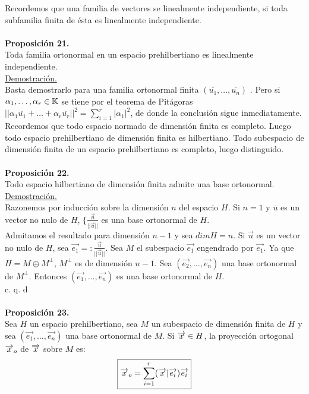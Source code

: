 Recordemos que una familia de vectores se linealmente independiente, si toda subfamilia finita de ésta es linealmente independiente. \\
 \\
 \textbf{Proposición 21.} \\
 Toda familia ortonormal en un espacio prehilbertiano es linealmente independiente.
 \\
 \underline{Demostración.}  \\
 Basta demostrarlo para una familia ortonormal finita $(\overline{u_1}, \ldots, \overline{u_n})$ . Pero si $\alpha_1 , \ldots, \alpha_r \in \mathbb{K}$ se tiene por el teorema de Pitágoras $|| \alpha_1 \overline{u_1}+ \ldots + \alpha_r \overline{u_r}||^2=\sum_{i=1}^r | \alpha_1|^2$, de donde la conclusión sigue inmediatamente. \\
 Recordemos que todo espacio normado de dimensión finita es completo. Luego todo espacio prehilbertiano de dimensión finita es hilbertiano. Todo subespacio de dimensión finita de un espacio prehilbertiano es completo, luego distinguido. \\ \\
 \textbf{Proposición 22.}\\
 Todo espacio hilbertiano de dimensión finita admite una base ortonormal.
 \\
 \underline{Demostración.} \\
 Razonemos por inducción sobre la dimensión $n$ del espacio $H$. Si $n=1$ y $\overline{u}$ es un vector no nulo de $H$, $\lbrace \frac{\overrightarrow{u}}{|| \overrightarrow{u} ||}$ es una base ortonormal de $H$.\\
 
 Admitamos el resultado para dimensión $n-1$ y sea $dim H=n$. Si $\overrightarrow{u}$ es un vector no nulo de $H$, sea $\overrightarrow{e_1}=: \frac{\overrightarrow{u}}{|| \overrightarrow{u} ||}$. Sea $M$ el subespacio $\overrightarrow{e_1}$ engendrado por $\overrightarrow{e_1}$. Ya que $H=M\oplus M^\perp$, $M^\perp$ es de dimensión $n-1$. Sea $(\overrightarrow{e_2}, \ldots , \overrightarrow{e_n})$ una base ortonormal de $M^\perp$. Entonces $(\overrightarrow{e_1}, \ldots , \overrightarrow{e_n})$ es una base ortonormal de $H$. \\
\phantom{sssssssssssssssssssssssssssssssssss sasdasdasdasdadadssada} c. q. d \\ \\

\textbf{Proposición 23.} \\
Sea $H$ un espacio prehilbertiano, sea $M$ un subespacio de dimensión finita de $H$ y sea $(\overrightarrow{e_1}, \ldots , \overrightarrow{e_n})$ una base ortonormal de $M$. Si $\overrightarrow{x} \in H$, la proyección ortogonal $\overrightarrow{x}_o$ de $\overrightarrow{x}$ sobre $M$ es:
\begin{equation*}
\boxed{\overrightarrow{x}_o=\sum_{i=1}^r (\overrightarrow{x}| \overrightarrow{e_i})\overrightarrow{e_i}}
\end{equation*} 
 
